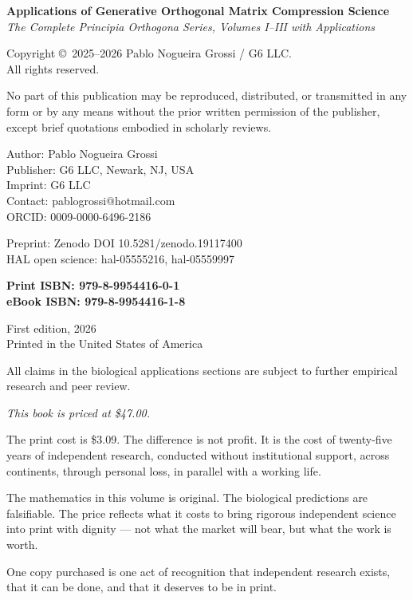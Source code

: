 \documentclass[12pt, oneside]{book}
\theoremstyle{plain}
\theoremstyle{definition}
\theoremstyle{remark}
\begin{document}
\thispagestyle{empty}
\vspace*{2cm}
{\small
\noindent\textbf{Applications of Generative Orthogonal Matrix Compression Science}\\
\textit{The Complete Principia Orthogona Series, Volumes I--III with Applications}

\bigskip
\noindent Copyright \copyright\ 2025--2026 Pablo Nogueira Grossi / G6 LLC.\\
All rights reserved.

\bigskip
\noindent No part of this publication may be reproduced, distributed, or transmitted
in any form or by any means without the prior written permission of the publisher,
except brief quotations embodied in scholarly reviews.

\bigskip
\noindent Author: Pablo Nogueira Grossi\\
Publisher: G6 LLC, Newark, NJ, USA\\
Imprint: G6 LLC\\
Contact: pablogrossi@hotmail.com\\
ORCID: 0009-0000-6496-2186

\bigskip
\noindent Preprint: Zenodo DOI 10.5281/zenodo.19117400\\
HAL open science: hal-05555216, hal-05559997

\bigskip
\noindent\textbf{Print ISBN: 979-8-9954416-0-1}\\
\textbf{eBook ISBN: 979-8-9954416-1-8}

\bigskip
\noindent First edition, 2026\\
Printed in the United States of America

\bigskip
{\footnotesize All claims in the biological applications sections are subject to
further empirical research and peer review.}

\bigskip
{\footnotesize\itshape
This book is priced at \$47.00.

The print cost is \$3.09. The difference is not profit.
It is the cost of twenty-five years of independent research,
conducted without institutional support, across continents,
through personal loss, in parallel with a working life.

The mathematics in this volume is original. The biological
predictions are falsifiable. The price reflects what it costs
to bring rigorous independent science into print with dignity
--- not what the market will bear, but what the work is worth.

One copy purchased is one act of recognition that independent
research exists, that it can be done, and that it deserves
to be in print.}
}
\cleardoublepage
\end{document}
